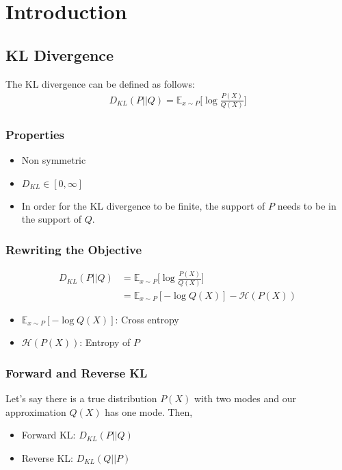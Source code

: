 \chapter{Introduction}
\section{KL Divergence}
The KL divergence can be defined as follows:
\begin{align*}
	D_{KL}(P||Q) = \mathbb{E}_{x\sim P}\Bigg[\log \frac{P(X)}{Q(X)}\Bigg]
\end{align*}

\subsection{Properties}
\begin{itemize}
	\item Non symmetric
	\item $D_{KL} \in [0,\infty]$ 
	\item In order for the KL divergence to be finite, the support of $P$ needs to be in the support of $Q$. 
\end{itemize}

\subsection{Rewriting the Objective}
\begin{align*}
	D_{KL}(P||Q) &= \mathbb{E}_{x\sim P}\Bigg[\log \frac{P(X)}{Q(X)}\Bigg]\\
	&= \mathbb{E}_{x\sim P} [-\log Q(X)] - \mathcal{H}(P(X))
\end{align*}

\begin{itemize}
	\item $\mathbb{E}_{x\sim P} [-\log Q(X)]$: Cross entropy
	\item $\mathcal{H}(P(X))$: Entropy of $P$
\end{itemize}

\subsection{Forward and Reverse KL}

Let's say there is a true distribution $P(X)$ with two modes and our approximation $Q(X)$ has one mode. Then,

\begin{itemize}
	\item Forward KL: $D_{KL}(P||Q)$
	\item Reverse KL: $D_{KL}(Q||P)$
\end{itemize}

